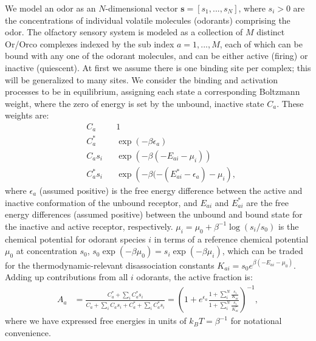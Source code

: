 \documentclass[9pt,twoside]{pnas-new}
\begin{document}
We model an odor as an $N$-dimensional vector ${\mathbf s=[ s_1,...,s_N]}$, where $s_i > 0$ are the concentrations of individual volatile molecules (odorants) comprising the odor. 
The olfactory sensory system is modeled as a collection of $M$ distinct Or/Orco complexes indexed by the sub index $a=1,...,M$, each of which can be bound with any one of the odorant molecules, and can be either active (firing) or inactive (quiescent). At first we assume there is one binding site per complex; this will be generalized to many sites. We consider the binding and activation processes to be in equilibrium, assigning each state a corresponding Boltzmann weight, where the zero of energy is set by the unbound, inactive state $C_a$. These weights are:
\begin{align}
    &C_a        &&      1 \nonumber \\
    &C^*_a      &&      \exp({-\beta \epsilon_a}) \nonumber \\
    &C_as_i     &&      \exp({-\beta(-E_{ai}  - \mu_{i})}) \nonumber \\
    &C^*_as_i   &&      \exp({-\beta(-(E_{ai}^* - \epsilon_a) - \mu_{i}}),
\end{align}
where $\epsilon_a$ (assumed positive) is the free energy difference between the active and inactive conformation of the unbound receptor, and $E_{ai}$ and $E_{ai}^*$ are the free energy differences (assumed positive) between the unbound and bound state for the inactive and active receptor, respectively. $\mu_{i}=\mu_0+\beta^{-1}\log(s_i/s_0)$ is the chemical potential for odorant species $i$ in terms of a reference chemical potential $\mu_0$ at concentration $s_0$, $s_0\exp(-\beta \mu_0) = s_i\exp(-\beta \mu_{i})$, which can be traded for the thermodynamic-relevant disassociation constants $K_{ai} = s_0 e^{\beta (-E_{ai} - \mu_0)}$. %
Adding up contributions from all $i$ odorants, the active fraction is:
\begin{align}
A_a &= \frac{
    C^*_a + \sum_i C^*_as_i}{C_a + \sum_i C_as_i + C^*_a + \sum_i C^*_as_i} %
    = 
    \left(1 + e^{\epsilon_a}\frac{1 + \sum_i^N \frac{s_i}{K_{ai}}}{1 + \sum_i^N \frac{s_i}{K^*_{ai}}}
    \right)^{-1}, 
    \label{eq:steady_state_act}
\end{align} 
where we have expressed free energies in units of $k_B T=\beta^{-1}$ for notational convenience.
\end{document}
